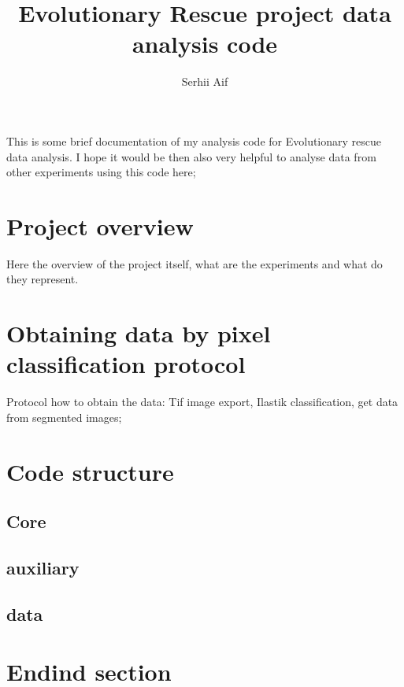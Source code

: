 \documentclass [12pt,a4paper ,oneside ]{article}
\title{Evolutionary Rescue project data analysis code}
\author{Serhii Aif}
\begin{document}
	\maketitle
This is some brief documentation of my analysis code for Evolutionary rescue data analysis. I hope it would be then also very helpful to analyse data from other experiments using this code here; 
	\section{Project overview} \label{sec: project overview}
	 Here the overview of the project itself, what are the experiments and what do they represent. 
	\section{Obtaining data by pixel classification protocol} \label{sec: obtain data protocol}
	Protocol how to obtain the data: Tif image export, Ilastik classification, get data from segmented images;
	\section{Code structure} \label{sec: code structure}
	\subsection{Core}
	\subsection{auxiliary}
	\subsection{data}
	
	\section{Endind section}
\end{document}
